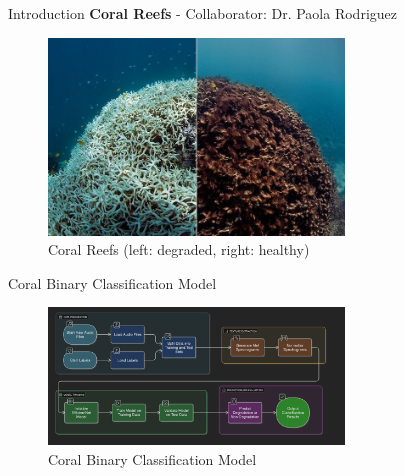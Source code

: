 
\begin{frame}{Introduction}
        \textbf{Coral Reefs} - Collaborator: Dr. Paola Rodriguez
        \begin{figure}
            \includegraphics[height=0.7\textheight,width=0.7\textwidth,keepaspectratio]{images/aid_2.jpg}
            \caption{Coral Reefs (left: degraded, right: healthy)}
        \end{figure}
    \end{frame}

\begin{frame}{Coral Binary Classification Model}
    \begin{figure}
        \centering
        \includegraphics[height=0.7\textheight,width=0.7\textwidth,keepaspectratio]{images/aid_1.png}
        \caption{Coral Binary Classification Model}
    \end{figure}
\end{frame}

